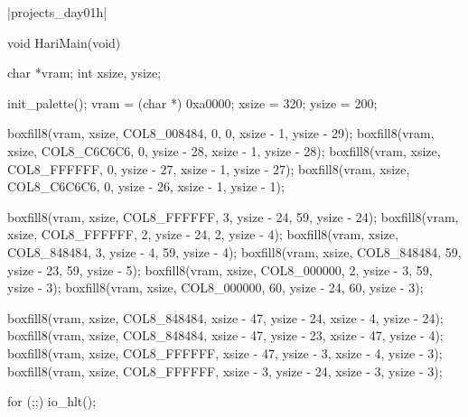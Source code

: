 \dag|projects_day\harib01h|
\begin{code}[label=bootpack.c]
void HariMain(void)
{
	char *vram;
	int xsize, ysize;

	init_palette();
	vram = (char *) 0xa0000;
	xsize = 320;
	ysize = 200;

	boxfill8(vram, xsize, COL8_008484,  0,         0,          xsize -  1, ysize - 29);
	boxfill8(vram, xsize, COL8_C6C6C6,  0,         ysize - 28, xsize -  1, ysize - 28);
	boxfill8(vram, xsize, COL8_FFFFFF,  0,         ysize - 27, xsize -  1, ysize - 27);
	boxfill8(vram, xsize, COL8_C6C6C6,  0,         ysize - 26, xsize -  1, ysize -  1);

	boxfill8(vram, xsize, COL8_FFFFFF,  3,         ysize - 24, 59,         ysize - 24);
	boxfill8(vram, xsize, COL8_FFFFFF,  2,         ysize - 24,  2,         ysize -  4);
	boxfill8(vram, xsize, COL8_848484,  3,         ysize -  4, 59,         ysize -  4);
	boxfill8(vram, xsize, COL8_848484, 59,         ysize - 23, 59,         ysize -  5);
	boxfill8(vram, xsize, COL8_000000,  2,         ysize -  3, 59,         ysize -  3);
	boxfill8(vram, xsize, COL8_000000, 60,         ysize - 24, 60,         ysize -  3);

	boxfill8(vram, xsize, COL8_848484, xsize - 47, ysize - 24, xsize -  4, ysize - 24);
	boxfill8(vram, xsize, COL8_848484, xsize - 47, ysize - 23, xsize - 47, ysize -  4);
	boxfill8(vram, xsize, COL8_FFFFFF, xsize - 47, ysize -  3, xsize -  4, ysize -  3);
	boxfill8(vram, xsize, COL8_FFFFFF, xsize -  3, ysize - 24, xsize -  3, ysize -  3);

	for (;;) {
		io_hlt();
	}
}
\end{code}


